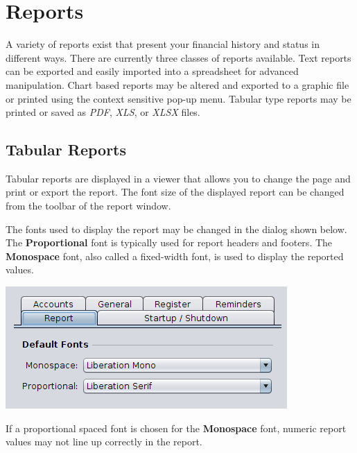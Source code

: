 \documentclass[letterpaper,12pt]{book}
\begin{document}

    \chapter{Reports}
    A variety of reports exist that present your financial history and status in different ways.
    There are currently three classes of reports available.
    Text reports can be exported and easily imported into a spreadsheet for advanced manipulation.
    Chart based reports may be altered and exported to a graphic file or printed using the context sensitive pop-up menu.
    Tabular type reports may be printed or saved as \textit{PDF}, \textit{XLS}, or \textit{XLSX} files.

    \section{Tabular Reports}
    Tabular reports are displayed in a viewer that allows you to change the page and print or export the report.
    The font size of the displayed report can be changed from the toolbar of the report window.

    The fonts used to display the report may be changed in the 
    dialog shown below. The \textbf{Proportional} font is typically used for report headers and footers.
    The \textbf{ Monospace} font, also called a fixed-width font, is used to display the reported values.

    \includegraphics[width=0.6\linewidth]{images/font-options.png}

    If a proportional spaced font is chosen for the \textbf{ Monospace} font, numeric report values may not line up
    correctly in the report.

\end{document}
